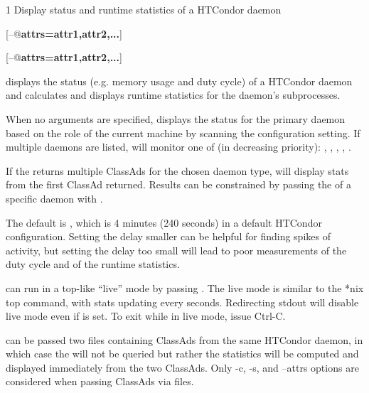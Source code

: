 \begin{ManPage}{\label{man-condor-top}}{1}
{Display status and runtime statistics of a HTCondor daemon}


\Synopsis {}

[\verb@--@\textbf{attrs=\lt{}attr1,attr2,...\gt{}}]

[\verb@--@\textbf{attrs=\lt{}attr1,attr2,...\gt{}}]

\Description
{} displays the status 
(e.g. memory usage and duty cycle) 
of a HTCondor daemon
and calculates and displays runtime statistics 
for the daemon's subprocesses.

When no arguments are specified,
 displays the status 
for the primary daemon
based on the role of the current machine
by scanning the 
configuration setting.
If multiple daemons are listed,
 will monitor one of (in decreasing priority): 
, 
, 
, 
, 
.

If the  returns multiple ClassAds 
for the chosen daemon type,
 will display stats from the first ClassAd returned.
Results can be constrained
by passing the  of a specific daemon with .

The default  is ,
which is 4 minutes (240 seconds)
in a default HTCondor configuration.
Setting the delay smaller 
can be helpful 
for finding spikes of activity,
but setting the delay too small
will lead to poor measurements
of the duty cycle
and of the runtime statistics.

 can run in a top-like ``live'' mode
by passing .
The live mode is similar to the *nix top command,
with stats updating every  seconds.
Redirecting stdout will disable live mode
even if  is set.
To exit  while in live mode,
issue Ctrl-C.

 can be passed two files containing ClassAds
from the same HTCondor daemon,
in which case the  will not be queried
but rather the statistics will be computed and displayed immediately
from the two ClassAds.
Only -c, -s, and --attrs options are considered 
when passing ClassAds via files.


\end{ManPage}
